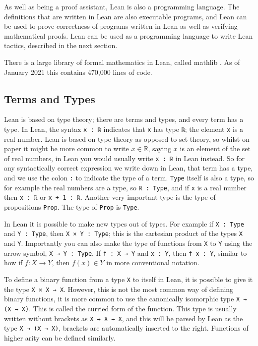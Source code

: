 \documentclass[12pt]{article} %
\theoremstyle{definition}
\theoremstyle{definition}
\theoremstyle{definition}
\theoremstyle{definition}
\theoremstyle{definition}
\theoremstyle{definition}
\begin{document}
As well as being a proof assistant, Lean is also a programming language. The definitions
that are written in Lean are also executable programs, and Lean can be used to prove correctness
of programs written in Lean as well as verifying mathematical proofs. Lean can
be used as a programming language to write Lean tactics, described in the next section.

There is a large library of formal mathematics in Lean, called mathlib
\cite{ThemathlibCommunity2020}. As of January 2021 this contains 470,000 lines of code.

\subsection{Terms and Types}

Lean is based on type theory; there are terms and types, and every term has a type.
In Lean, the syntax \lstinline{x : ℝ} indicates that \lstinline{x} has type \lstinline{ℝ};
the element \lstinline{x} is a real number.
Lean is based on type theory as opposed to set theory, so whilst on paper it might
be more common to write $x \in \mathbb{R}$, saying $x$ is an element of the set of real numbers, in Lean
you would usually write \lstinline{x : ℝ} in Lean instead.
So for any syntactically correct expression we write down in Lean, that term has a type,
and we use the colon \lstinline{:} to indicate the type of a term.
\lstinline{Type} itself is also a type, so for example the real numbers are a type,
so \lstinline{ℝ : Type},
and if \lstinline{x} is a real number then \lstinline{x : ℝ} or \lstinline{x + 1 : ℝ}.
Another very important type is the type of propositions \lstinline{Prop}.
The type of \lstinline{Prop} is \lstinline{Type}.

In Lean it is possible to make new types out of types. For example if \lstinline{X : Type}
and \lstinline{Y : Type}, then \lstinline{X × Y : Type}; this is the cartesian
product of the types \lstinline{X} and \lstinline{Y}. Importantly you can also make the type
of functions from \lstinline{X} to \lstinline{Y} using the arrow symbol,
\lstinline{X → Y : Type}. If \lstinline{f : X → Y} and \lstinline{x : Y}, then
\lstinline{f x : Y}, similar to how if $f : X \to Y$, then $f(x) \in Y$
in more conventional notation.

To define a binary function from a type \lstinline{X} to itself in Lean,
it is possible to give it the type \lstinline{X × X → X}. However, this is not
the most common way of defining binary functions, it is more common to use the
canonically isomorphic type \lstinline{X → (X → X)}.
This is called the curried form of the function. This type is usually written without
brackets as \lstinline{X → X → X}, and this will be parsed by Lean as the type
\lstinline{X → (X → X)}, brackets are automatically inserted to the right.
Functions of higher arity can be defined similarly.
\end{document}
